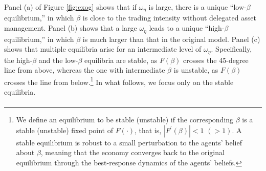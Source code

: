 Panel (a) of Figure \ref{fig:exog} shows that if $\omega_{\eta}$ is large, there is a unique ``low-$\beta$ equilibrium,'' in which  $\beta$ is close to the trading intensity without delegated asset management. Panel (b) shows that a large $\omega_{\eta}$ leads to a unique ``high-$\beta$ equilibrium,'' in which $\beta$ is much larger than that in the original \citet{kyle1985continuous} model.
Panel (c) shows that multiple equilibria arise for an intermediate level of $\omega_{\eta}$. Specifically, the high-$\beta$ and the low-$\beta$ equilibria are stable, as $F(\beta)$ crosses the 45-degree line from above, whereas the one with intermediate $\beta$ is unstable, as $F(\beta)$ crosses the line from below.\footnote{We define an equilibrium to be stable (unstable) if the corresponding $\beta$ is a stable (unstable) fixed point of $F(\cdot)$, that is, $|F^{\prime}(\beta)|<1$ $(>1)$. A stable equilibrium is robust to a small perturbation to the agents' belief about $\beta$, meaning that the economy converges back to the original equilibrium through the best-response dynamics of the agents' beliefs.}  In what follows, we focus only on the stable equilibria. 


\paragraph{}

